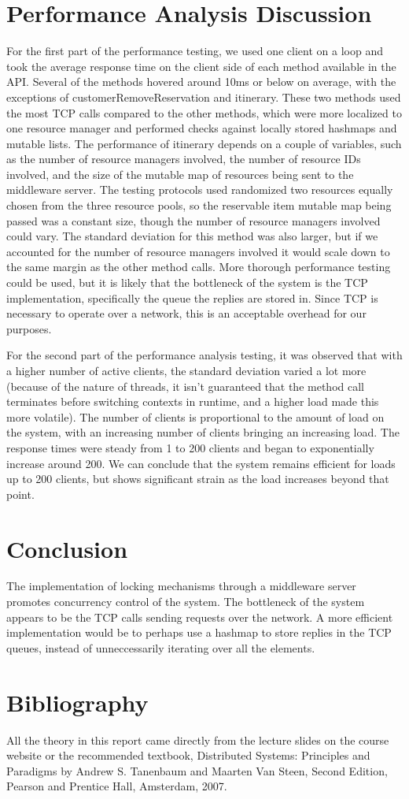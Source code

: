 \documentclass[letterpaper,12pt]{article}
\begin{document}
\section{Performance Analysis Discussion}
For the first part of the performance testing, we used one client on a loop and took the average response time on the client side of each method available in the API. Several of the methods hovered around 10ms or below on average, with the exceptions of customerRemoveReservation and itinerary. These two methods used the most TCP calls compared to the other methods, which were more localized to one resource manager and performed checks against locally stored hashmaps and mutable lists. The performance of itinerary depends on a couple of variables, such as the number of resource managers involved, the number of resource IDs involved, and the size of the mutable map of resources being sent to the middleware server. The testing protocols used randomized two resources equally chosen from the three resource pools, so the reservable item mutable map being passed was a constant size, though the number of resource managers involved could vary. The standard deviation for this method was also larger, but if we accounted for the number of resource managers involved it would scale down to the same margin as the other method calls. More thorough performance testing could be used, but it is likely that the bottleneck of the system is the TCP implementation, specifically the queue the replies are stored in. Since TCP is necessary to operate over a network, this is an acceptable overhead for our purposes.

For the second part of the performance analysis testing, it was observed that with a higher number of active clients, the standard deviation varied a lot more (because of the nature of threads, it isn't guaranteed that the method call terminates before switching contexts in runtime, and a higher load made this more volatile). The number of clients is proportional to the amount of load on the system, with an increasing number of clients bringing an increasing load. The response times were steady from 1 to 200 clients and began to exponentially increase around 200. We can conclude that the system remains efficient for loads up to 200 clients, but shows significant strain as the load increases beyond that point.
\section{Conclusion}

The implementation of locking mechanisms through a middleware server promotes concurrency control of the system. The bottleneck of the system appears to be the TCP calls sending requests over the network. A more efficient implementation would be to perhaps use a hashmap to store replies in the TCP queues, instead of unneccessarily iterating over all the elements.

\section{Bibliography}

All the theory in this report came directly from the lecture slides on the course website or the recommended textbook, Distributed Systems: Principles and Paradigms by Andrew S. Tanenbaum and Maarten Van Steen, Second Edition, Pearson and Prentice Hall, Amsterdam, 2007. 
\end{document}
